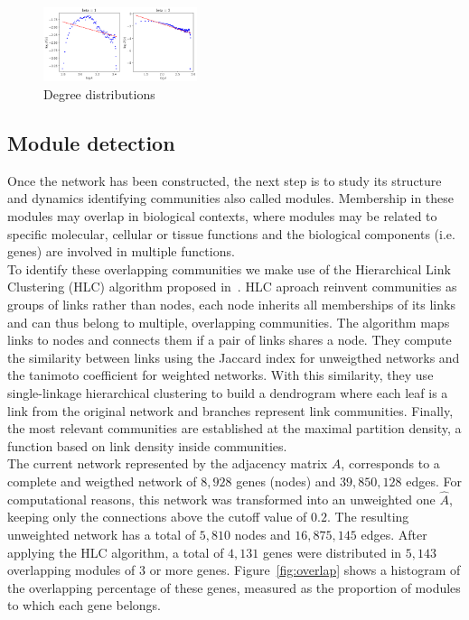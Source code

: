 \documentclass[conference]{IEEEtran}
\begin{document}
\begin{figure}[h]
  \centering
    \includegraphics[clip,width=0.4\textwidth]{Figures/pick_beta.png}
  \caption{Degree distributions}
  \label{fig:beta}
\end{figure}

\subsection{Module detection}	
Once the network has been constructed, the next step is to study its structure and dynamics identifying communities also called modules. Membership in these modules may overlap in biological contexts, where modules may be related to specific molecular, cellular or tissue functions and the biological components (i.e. genes) are involved in multiple functions.\\

To identify these overlapping communities we make use of the Hierarchical Link Clustering (HLC) algorithm proposed in~\cite{ahn2010link}. HLC aproach reinvent communities as groups of links rather than nodes, each node inherits all memberships of its links and can thus belong to multiple, overlapping communities. The algorithm maps links to nodes and connects them if a pair of links shares a node. They compute the similarity between links using the Jaccard index for unweigthed networks and the tanimoto coefficient for weighted networks. With this similarity, they use single-linkage hierarchical clustering to build a dendrogram where each leaf is a link from the original network and branches represent link communities. Finally, the most relevant communities are established at the maximal partition density, a function  based on link density inside communities.\\

The current network represented by the adjacency matrix $A$, corresponds to a complete and weigthed network of $8,928$ genes (nodes) and $39,850,128$ edges. For computational reasons, this network was transformed into an unweighted one $\hat{A}$, keeping only the connections above the cutoff value of $0.2$. The resulting unweighted network has a total of $5,810$ nodes and $16,875,145$ edges. After applying the HLC algorithm, a total of $4,131$ genes were distributed in $5,143$ overlapping modules of $3$ or more genes. Figure~\ref{fig:overlap} shows a histogram of the overlapping percentage of these genes, measured as the proportion of modules to which each gene belongs.\\
\end{document}
